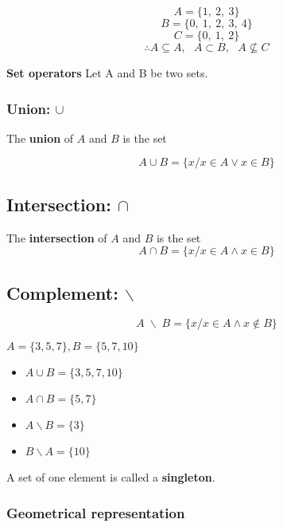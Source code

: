 \documentclass[12pt, a4paper]{book}
\begin{document}
\begin{exmp}
  \[
    A= \{ 1, \ 2, \ 3\} 
  \]
  \[
    B= \{ 0, \ 1, \ 2, \ 3, \ 4 \}
  \]
  \[
    C= \{ 0, \ 1, \ 2 \}
  \]
  \[
    \therefore
    A \subseteq A, \ \ \ A \subset B, \ \ \ A \nsubseteq C
  \]
\end{exmp}

\begin{defn}
  \textbf{Set operators}
  Let A and B be two sets. 
\end{defn}
\boldmath
\subsubsection*{Union: $\cup$}

The \textbf{union} of $A$ and $B$ is the set

\[ 
  A \cup B = \{x/x \in A \vee x \in B \}
\]

\subsection*{Intersection: $\cap$}

The \textbf{intersection} of $A$ and $B$ is the set
\[
  A \cap B = \{x/x \in A \wedge x \in B \}
\]

\subsection*{Complement: $\backslash$}

\[
  A \; \backslash \; B = \{x/x \in A \wedge x \notin B \}
\]
\unboldmath
\begin{exmp}
  $A=\{3,5,7\}, B=\{5,7,10\}$
  \begin{itemize}
    \item $A \cup B = \{3,5,7,10\}$
    \item $A \cap B = \{5,7\}$
    \item $A \backslash B = \{3\}$
    \item $B \backslash A = \{10\}$
  \end{itemize}
\end{exmp}

\begin{rem}
  A set of one element is called a \textbf{singleton}.
\end{rem}

\subsubsection*{Geometrical representation}
\end{document}
